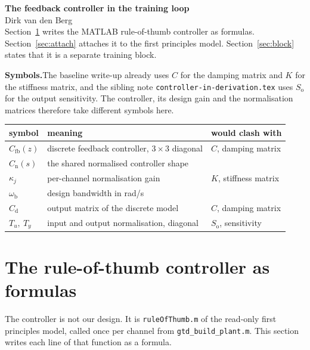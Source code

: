 \documentclass[11pt]{article}
\newcommand{\Cfb}{C_{\mathrm{fb}}}
\newcommand{\Cnorm}{C_{\mathrm{n}}}
\newcommand{\wb}{\omega_{\mathrm{b}}}
\newcommand{\Tu}{T_{u}}
\newcommand{\Ty}{T_{y}}
\begin{document}
\begin{center}
  {\LARGE\bfseries The feedback controller in the training loop}\\[0.4em]
  {\large Dirk van den Berg}\\[0.2em]
  {\small Section~\ref{sec:formulas} writes the MATLAB rule-of-thumb controller as formulas.
  Section~\ref{sec:attach} attaches it to the first principles model. Section~\ref{sec:block}
  states that it is a separate training block.}
\end{center}
\vspace{0.6em}

\noindent\textbf{Symbols.}\quad The baseline write-up already uses $C$ for the damping matrix and
$K$ for the stiffness matrix, and the sibling note \texttt{controller-in-derivation.tex} uses
$S_{\mathrm{o}}$ for the output sensitivity. The controller, its design gain and the normalisation
matrices therefore take different symbols here.

\begin{center}
\begin{tabular}{lll}
\toprule
symbol & meaning & would clash with \\
\midrule
$\Cfb(z)$        & discrete feedback controller, $3\times3$ diagonal & $C$, damping matrix \\
$\Cnorm(s)$      & the shared normalised controller shape            & \\
$\kappa_j$       & per-channel normalisation gain                    & $K$, stiffness matrix \\
$\wb$            & design bandwidth in rad/s                         & \\
$C_{\mathrm{d}}$ & output matrix of the discrete model               & $C$, damping matrix \\
$\Tu,\ \Ty$      & input and output normalisation, diagonal          & $S_{\mathrm{o}}$, sensitivity \\
\bottomrule
\end{tabular}
\end{center}

\section{The rule-of-thumb controller as formulas}
\label{sec:formulas}

The controller is not our design. It is \texttt{ruleOfThumb.m} of the read-only first principles
model, called once per channel from \texttt{gtd\_build\_plant.m}. This section writes each line of
that function as a formula.
\end{document}
